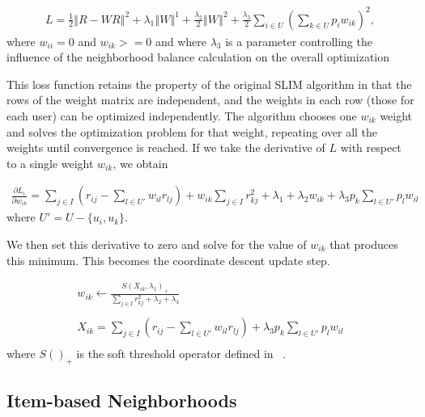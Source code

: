 \begin{equation}
\begin{split}
 L = \frac{1}{2}\left\Vert R - WR \right\Vert^2 + 
    \lambda_1 \left\Vert W \right\Vert^1 + 
    \frac{\lambda_2}{2}\left\Vert W \right\Vert^2 +
    \frac{\lambda_3}{2}\sum_{i \in U}\left(\sum_{k \in U}p_iw_{ik}\right)^2,
\end{split}
\end{equation}
where $w_{ii}=0$ and $w_{ik}>=0$ and where $\lambda_3$ is a parameter controlling the influence of the neighborhood balance calculation on the overall optimization

This loss function retains the property of the original SLIM algorithm in that the rows of the weight matrix are independent, and the weights in each row (those for each user) can be optimized independently. The algorithm chooses one $w_{ik}$ weight and solves the optimization problem for that weight, repeating over all the weights until convergence is reached. If we take the derivative of $L$ with respect to a single weight $w_{ik}$, we obtain

\begin{equation}\label{eq:derivative}
\begin{split}
\frac{\partial L_i}{\partial w_{ik}} = \sum_{j \in I}{(r_{ij} - 
    \sum_{l \in U'}{w_{il}r_{lj}})} + w_{ik}\sum_{j \in I}{r_{kj}^2} + 
    \lambda_1 + \lambda_2w_{ik} + \lambda_3p_k\sum_{l \in U'}{p_lw_{il}} 
\end{split}
\end{equation}
where $U' = U - \{u_i, u_k\}$.

We then set this derivative to zero and solve for the value of $w_{ik}$ that produces this minimum. This becomes the coordinate descent update step. 

\begin{equation}\label{eq:update}
\begin{split}
    w_{ik} \leftarrow \frac{S\left(X_{ik}, \lambda_1\right)_+}
    {\sum_{j \in I}{r_{kj}^2} + \lambda_2 + \lambda_3} \\ \\
    X_{ik} = \sum_{j \in I}{(r_{ij} - 
    \sum_{l \in U'}{w_{il}r_{lj}})}+\lambda_3p_k\sum_{l \in U'}{p_lw_{il}}\\
\end{split}
\end{equation}
where $S()_+$ is the soft threshold operator defined in ~\cite{friedman_pathwise_2007}.

\subsection{Item-based Neighborhoods}

